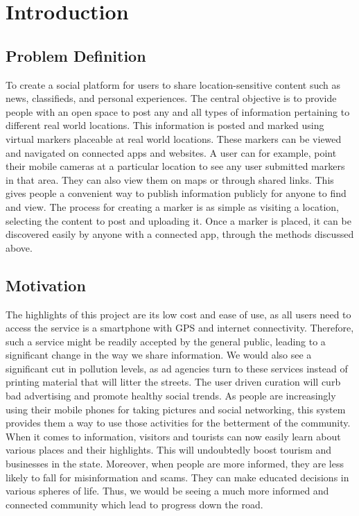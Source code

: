 \chapter{Introduction}

\section{Problem Definition}
To create a social platform for users to share location-sensitive content such as news, classifieds, and personal experiences. The central objective is to provide people with an open space to post any and all types of information pertaining to different real world locations. This information is posted and marked using virtual markers placeable at real world locations. These markers can be
viewed and navigated on connected apps and websites. A user can for example, point their
mobile cameras at a particular location to see any user submitted markers in that area. They
can also view them on maps or through shared links. This gives people a convenient
way to publish information publicly for anyone to find and view.
The process for creating a marker is as simple as visiting a location, selecting the content to post
and uploading it. Once a marker is placed, it can be discovered easily by anyone with a connected
app, through the methods discussed above.

\section{Motivation} 
The highlights of this project are its low cost and ease of use, as all users need to access
the service is a smartphone with GPS and internet connectivity. Therefore, such a service
might be readily accepted by the general public, leading to a significant change in the
way we share information.
We would also see a significant cut in pollution levels, as ad agencies turn to these
services instead of printing material that will litter the streets. The user driven curation
will curb bad advertising and promote healthy social trends.
As people are increasingly using their mobile phones for taking pictures and social
networking, this system provides them a way to use those activities for the betterment of
the community.
When it comes to information, visitors and tourists can now easily learn about various
places and their highlights. This will undoubtedly boost tourism and businesses in the
state.
Moreover, when people are more informed, they are less likely to fall for misinformation
and scams. They can make educated decisions in various spheres of life.
Thus, we would be seeing a much more informed and connected community which lead
to progress down the road.

